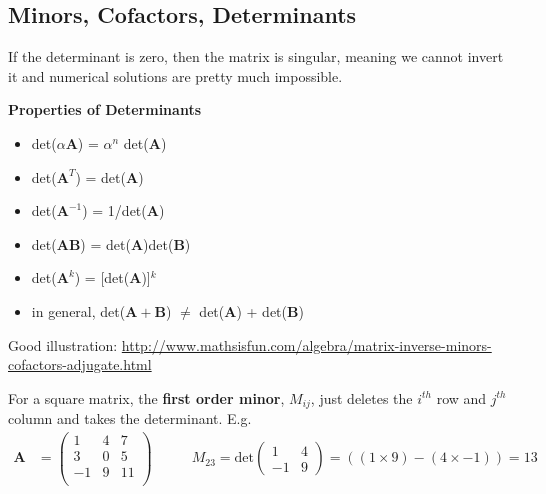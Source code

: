 \documentclass[12pt]{article}
\newcommand{\ve}[1]{\ensuremath{\mathbf{#1}}}
\begin{document}
\subsection*{Minors, Cofactors, Determinants}
If the determinant is zero, then the matrix is singular, meaning we cannot invert it and numerical solutions are pretty much impossible.

\textbf{Properties of Determinants}
\begin{itemize}
\item det($\alpha\ve{A}$) = $\alpha^n$ det($\ve{A}$)

\item det($\ve{A}^T$) = det($\ve{A}$)

\item det($\ve{A}^{-1}$) = 1/det($\ve{A}$)

\item det($\ve{AB}$) = det($\ve{A}$)det($\ve{B}$)

\item det($\ve{A}^k$) = [det($\ve{A}$)]$^k$

\item in general, det($\ve{A + B}$) $\neq$ det($\ve{A}$) + det($\ve{B}$) 
\end{itemize}

Good illustration: \href{http://www.mathsisfun.com/algebra/matrix-inverse-minors-cofactors-adjugate.html}{http://www.mathsisfun.com/algebra/matrix-inverse-minors-cofactors-adjugate.html}


For a square matrix, the \textbf{first order minor}, $M_{ij}$, just deletes the $i^{th}$ row and $j^{th}$ column and takes the determinant. E.g.
%
\begin{align}
    \ve{A} &= \begin{pmatrix}
        1 & 4 & 7 \\
        3 & 0 & 5 \\
        -1 & 9 & 11 \\
    \end{pmatrix} 
    \qquad
    &M_{23} = \text{det}\begin{pmatrix}
       1 & 4 \\
       -1 & 9 
    \end{pmatrix}   
    = ((1 \times 9) - (4 \times -1)) = 13 \nonumber
\end{align} 
\end{document}
